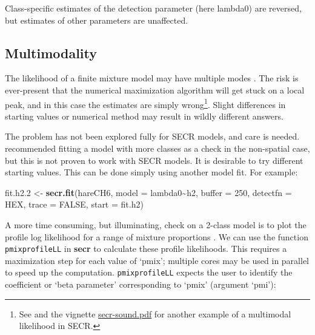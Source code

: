 \documentclass[
]{book}
\newenvironment{Shaded}{\begin{snugshade}}{\end{snugshade}}
\newcommand{\AttributeTok}[1]{\textcolor[rgb]{0.13,0.29,0.53}{#1}}
\newcommand{\ConstantTok}[1]{\textcolor[rgb]{0.56,0.35,0.01}{#1}}
\newcommand{\DecValTok}[1]{\textcolor[rgb]{0.00,0.00,0.81}{#1}}
\newcommand{\FloatTok}[1]{\textcolor[rgb]{0.00,0.00,0.81}{#1}}
\newcommand{\FunctionTok}[1]{\textcolor[rgb]{0.13,0.29,0.53}{\textbf{#1}}}
\newcommand{\NormalTok}[1]{#1}
\newcommand{\OtherTok}[1]{\textcolor[rgb]{0.56,0.35,0.01}{#1}}
\newcommand{\SpecialCharTok}[1]{\textcolor[rgb]{0.81,0.36,0.00}{\textbf{#1}}}
\newcommand{\StringTok}[1]{\textcolor[rgb]{0.31,0.60,0.02}{#1}}
\begin{document}
Class-specific estimates of the detection parameter (here lambda0) are reversed, but estimates of other parameters are unaffected.

\subsection{Multimodality}\label{multimodality}


The likelihood of a finite mixture model may have multiple modes \citep{Brooks1997, p2000}. The risk is ever-present
that the numerical maximization algorithm will get stuck on a local peak, and in this case the estimates are simply wrong\footnote{See \citet{de09} and the vignette \href{https://www.otago.ac.nz/density/pdfs/secr-sound.pdf}{secr-sound.pdf} for another example of a multimodal likelihood in SECR.}. Slight differences in starting values or numerical method may result in
wildly different answers.

The problem has not been explored fully for SECR models, and care is needed. \citet{p2000} recommended fitting a model with more classes as a check in the non-spatial case, but this is not proven to work with SECR models. It is desirable to try different starting values. This can be done simply using another model fit. For example:

\begin{Shaded}
\begin{Highlighting}[]
\NormalTok{fit.h2}\FloatTok{.2} \OtherTok{\textless{}{-}} \FunctionTok{secr.fit}\NormalTok{(hareCH6, }\AttributeTok{model =}\NormalTok{ lambda0}\SpecialCharTok{\textasciitilde{}}\NormalTok{h2, }\AttributeTok{buffer =} \DecValTok{250}\NormalTok{, }
    \AttributeTok{detectfn =} \StringTok{\textquotesingle{}HEX\textquotesingle{}}\NormalTok{, }\AttributeTok{trace =} \ConstantTok{FALSE}\NormalTok{, }\AttributeTok{start =}\NormalTok{ fit.h2)}
\end{Highlighting}
\end{Shaded}

A more time consuming, but illuminating, check on a 2-class model is to plot the profile log likelihood for a range of mixture proportions \citep{Brooks1997}. We can use the function \texttt{pmixprofileLL} in \textbf{secr} to calculate these profile likelihoods. This requires a maximization step for each value of `pmix'; multiple cores may be used in parallel to speed up the computation. \texttt{pmixprofileLL} expects the user to identify the coefficient or `beta parameter' corresponding to `pmix' (argument `pmi'):
\end{document}
